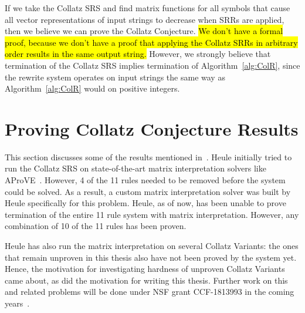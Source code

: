 If we take the Collatz SRS and find matrix functions for all symbols that cause all vector representations of input strings to decrease when SRRs are applied, then we believe we can prove the Collatz Conjecture. \hl{We don't have a formal proof, because we don't have a proof that applying the Collatz SRRs in arbitrary order results in the same output string.} However, we strongly believe that termination of the Collatz SRS implies termination of Algorithm~\ref{alg:ColR}, since the rewrite system operates on input strings the same way as Algorithm~\ref{alg:ColR} would on positive integers.
\section{Proving Collatz Conjecture Results} \label{subsec:provingCollatzresults}
This section discusses some of the results mentioned in~\cite{HeuleAaronson}. Heule initially tried to run the Collatz SRS on state-of-the-art matrix interpretation solvers like AProVE~\cite{Giesletal:2004}. However, 4 of the 11 rules needed to be removed before the system could be solved. As a result, a custom matrix interpretation solver was built by Heule specifically for this problem. Heule, as of now, has been unable to prove termination of the entire 11 rule system with matrix interpretation. However, any combination of 10 of the 11 rules has been proven. \par
Heule has also run the matrix interpretation on several Collatz Variants: the ones that remain unproven in this thesis also have not been proved by the system yet. Hence, the motivation for investigating hardness of unproven Collatz Variants came about, as did the motivation for writing this thesis. Further work on this and related problems will be done under NSF grant CCF-1813993 in the coming years~\cite{HeuleAaronson}.

